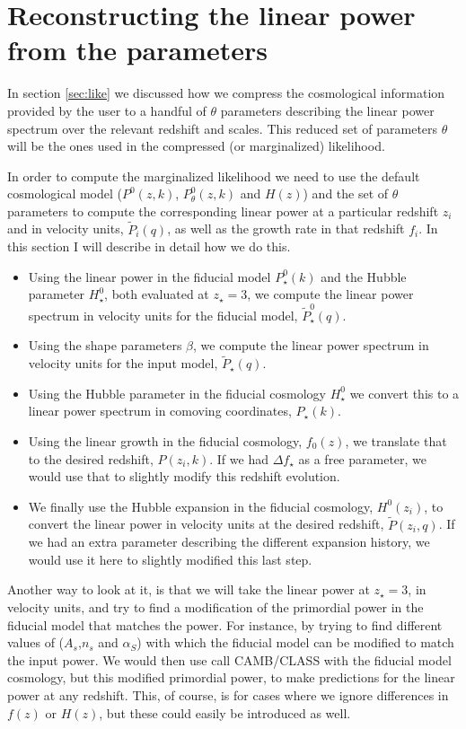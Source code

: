 \section{Reconstructing the linear power from the parameters} \label{app:P_L}

In section \ref{sec:like} we discussed how we compress the cosmological
information provided by the user to a handful of $\theta$ parameters
describing the linear power spectrum over the relevant redshift and scales.
This reduced set of parameters $\theta$ will be the ones used in the
compressed (or marginalized) likelihood.

In order to compute the marginalized likelihood we need to use the default
cosmological model ($P^0(z,k)$, $P_\theta^0(z,k)$ and $H(z)$) and the set
of $\theta$ parameters to compute the corresponding linear power at a
particular redshift $z_i$ and in velocity units, $\tilde P_i(q)$, as well
as the growth rate in that redshift $f_i$.
In this section I will describe in detail how we do this.

\begin{itemize}
 \item Using the linear power in the fiducial model $P_\star^0(k)$ and the
  Hubble parameter $H^0_\star$, both evaluated at $z_\star=3$, we compute
  the linear power spectrum in velocity units for the fiducial model,
  $\tilde P^0_\star(q)$.
 \item Using the shape parameters $\beta$, we compute the linear power
  spectrum in velocity units for the input model, $\tilde P_\star(q)$.
 \item Using the Hubble parameter in the fiducial cosmology $H^0_\star$
  we convert this to a linear power spectrum in comoving coordinates,
  $P_\star(k)$.
 \item Using the linear growth in the fiducial cosmology, $f_0(z)$, we
  translate that to the desired redshift, $P(z_i,k)$.
  If we had $\Delta f_\star$ as a free parameter, we would use that to
  slightly modify this redshift evolution.
 \item We finally use the Hubble expansion in the fiducial cosmology,
  $H^0(z_i)$, to convert the linear power in velocity units at the desired
  redshift, $\tilde P(z_i,q)$.
  If we had an extra parameter describing the different expansion history,
  we would use it here to slightly modified this last step.
\end{itemize}

Another way to look at it, is that we will take the linear power at 
$z_\star=3$, in velocity units, and try to find a modification of the
primordial power in the fiducial model that matches the power.
For instance, by trying to find different values of ($A_s$,$n_s$ and 
$\alpha_S$) with which the fiducial model can be modified to match the
input power. 
We would then use call CAMB/CLASS with the fiducial model cosmology, but
this modified primordial power, to make predictions for the linear power
at any redshift.
This, of course, is for cases where we ignore differences in $f(z)$ or
$H(z)$, but these could easily be introduced as well.

